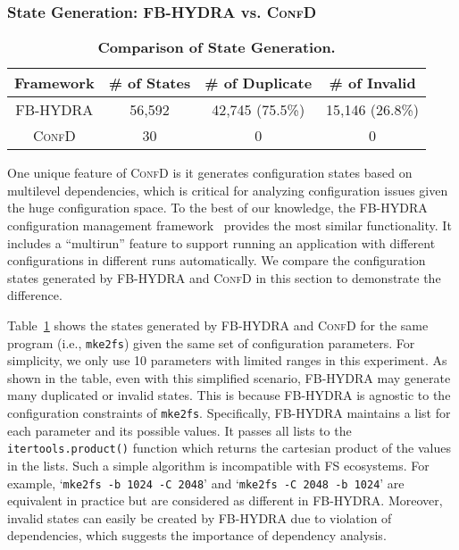  



\vspace{-0.05in}
\subsubsection{State Generation:  FB-HYDRA vs. \textsc{ConfD}}
\label{sec:state-generation-vs-fb-hydra}
\vspace{-0.05in}


\begin{table}[t]
	\small
	\begin{center}
		\begin{tabular}{ c | c | c | c  }
 	\textbf{Framework}  & \textbf{\space \space \# of States \space \space}  & \textbf{\# of Duplicate}  &  \textbf{\# of Invalid} \\
          \hline
FB-HYDRA  & 56,592 &  42,745 (75.5\%)  &  15,146 (26.8\%)   \\
			\hline
		\textsc{ConfD}    & 30 &  0 &  0  \\
	\hline
 
		\end{tabular}
	\end{center}

	\caption{ {\bf Comparison of State Generation.} 
}
	\label{tab:vs-fb-hydra}
	\vspace{-0.1in}
\end{table}

One unique feature of \textsc{ConfD} is it generates configuration states based on  multilevel dependencies, which is critical for analyzing configuration issues given the huge configuration space.
To the best of our knowledge, the FB-HYDRA configuration management framework~\cite{Yadan2019Hydra} provides the most similar functionality. It includes a ``multirun'' feature to support running an application with different configurations in different runs automatically. We compare the configuration states generated by FB-HYDRA and \textsc{ConfD} in this section to demonstrate the difference.

Table~\ref{tab:vs-fb-hydra} shows  the states generated by FB-HYDRA and \textsc{ConfD} for the same program (i.e., \texttt{mke2fs}) given the same set of  configuration parameters.  For simplicity, we only use 10 parameters with limited ranges  in this experiment. 
As shown in the table, even with this simplified scenario, FB-HYDRA may generate many duplicated    or  invalid states. This is because FB-HYDRA is agnostic to the configuration constraints of \texttt{mke2fs}. 
Specifically, FB-HYDRA maintains a list for each parameter and its possible values. It  passes all lists to the \texttt{itertools.product()} function which returns the cartesian product of the values in the lists.
Such a simple algorithm is incompatible with FS ecosystems. For example, `\texttt{mke2fs -b 1024 -C 2048}' and `\texttt{mke2fs -C 2048 -b 1024}' are equivalent in practice but are considered as different in FB-HYDRA. Moreover, invalid states can easily be created by FB-HYDRA due to violation of dependencies, which suggests the importance of dependency analysis.

